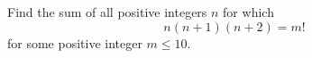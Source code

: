 Find the sum of all positive integers $n$ for which
\[n(n+1)(n+2)=m!\]
for some positive integer $m\le10$.
